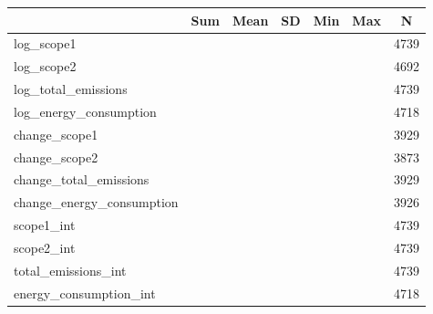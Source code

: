 {
\def\sym#1{\ifmmode^{#1}\else\(^{#1}\)\fi}
\begin{tabular}{l*{1}{cccccc}}
\toprule
                    &         Sum&        Mean&          SD&         Min&         Max&           N\\
\midrule
log\_scope1          &            &            &            &            &            &        4739\\
log\_scope2          &            &            &            &            &            &        4692\\
log\_total\_emissions &            &            &            &            &            &        4739\\
log\_energy\_consumption&            &            &            &            &            &        4718\\
change\_scope1       &            &            &            &            &            &        3929\\
change\_scope2       &            &            &            &            &            &        3873\\
change\_total\_emissions&            &            &            &            &            &        3929\\
change\_energy\_consumption&            &            &            &            &            &        3926\\
scope1\_int          &            &            &            &            &            &        4739\\
scope2\_int          &            &            &            &            &            &        4739\\
total\_emissions\_int &            &            &            &            &            &        4739\\
energy\_consumption\_int&            &            &            &            &            &        4718\\
\bottomrule
\end{tabular}
}
